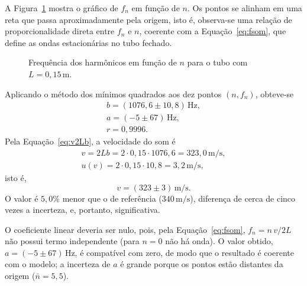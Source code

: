 \documentclass[12pt, a4paper]{article}
\newcommand{\un}[1]{\,\mathrm{#1}}
\newcommand{\fonte}[1]{\par\vspace{2pt}{\footnotesize Fonte: #1}}
\begin{document}
A Figura~\ref{fig:som_f} mostra o gráfico de $f_n$ em função de $n$. Os pontos se alinham em uma reta que passa aproximadamente pela origem, isto é, observa-se uma relação de proporcionalidade direta entre $f_n$ e $n$, coerente com a Equação~\eqref{eq:fsom}, que define as ondas estacionárias no tubo fechado.

\begin{figure}[H]
\centering
\caption{Frequência dos harmônicos em função de $n$ para o tubo com $L=0{,}15\un{m}$.}
\label{fig:som_f}
\fonte{Elaborada pelos autores.}
\end{figure}

Aplicando o método dos mínimos quadrados aos dez pontos $(n,f_n)$, obteve-se
\begin{gather*}
b=(1076{,}6\pm10{,}8)\un{Hz},\\
a=(-5\pm67)\un{Hz},\\
r=0{,}9996.
\end{gather*}
Pela Equação~\eqref{eq:v2Lb}, a velocidade do som é
\begin{gather*}
v=2Lb=2\cdot0{,}15\cdot1076{,}6=323{,}0\un{m/s},\\
u(v)=2\cdot0{,}15\cdot10{,}8=3{,}2\un{m/s},
\end{gather*}
isto é,
\[
v=(323\pm3)\un{m/s}.
\]
O valor é $5{,}0\%$ menor que o de referência ($340\un{m/s}$), diferença de cerca de cinco vezes a incerteza, e, portanto, significativa.

O coeficiente linear deveria ser nulo, pois, pela Equação~\eqref{eq:fsom}, $f_n=n\,v/2L$ não possui termo independente (para $n=0$ não há onda). O valor obtido, $a=(-5\pm67)\un{Hz}$, é compatível com zero, de modo que o resultado é coerente com o modelo; a incerteza de $a$ é grande porque os pontos estão distantes da origem ($\bar{n}=5{,}5$).
\end{document}
